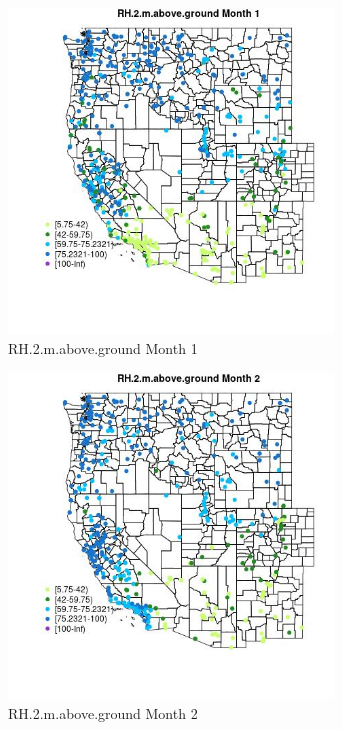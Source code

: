 \begin{figure} 
\centering  
\includegraphics[width=0.77\textwidth]{Code_Outputs/Report_ML_input_PM25_Step4_part_e_de_duplicated_aves_compiled_2019-05-18wNAs_MapObsMo1RH2maboveground.jpg} 
\caption{\label{fig:Report_ML_input_PM25_Step4_part_e_de_duplicated_aves_compiled_2019-05-18wNAsMapObsMo1RH2maboveground}RH.2.m.above.ground Month 1} 
\end{figure} 
 

\clearpage 

\begin{figure} 
\centering  
\includegraphics[width=0.77\textwidth]{Code_Outputs/Report_ML_input_PM25_Step4_part_e_de_duplicated_aves_compiled_2019-05-18wNAs_MapObsMo2RH2maboveground.jpg} 
\caption{\label{fig:Report_ML_input_PM25_Step4_part_e_de_duplicated_aves_compiled_2019-05-18wNAsMapObsMo2RH2maboveground}RH.2.m.above.ground Month 2} 
\end{figure} 
 

